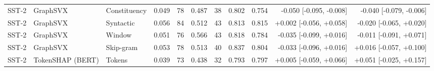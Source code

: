 \begin{table}[H]
\begin{tabular}{lllrrrrrrrr}
SST-2 & GraphSVX & Constituency & 0.049 & 78 & 0.487 & 38 & 0.802 & 0.754 & -0.050 [-0.095, -0.008] & -0.040 [-0.079, -0.006] \\
SST-2 & GraphSVX & Syntactic & 0.056 & 84 & 0.512 & 43 & 0.813 & 0.815 & +0.002 [-0.056, +0.058] & -0.020 [-0.065, +0.020] \\
SST-2 & GraphSVX & Window & 0.051 & 76 & 0.566 & 43 & 0.818 & 0.784 & -0.035 [-0.099, +0.016] & -0.011 [-0.091, +0.071] \\
SST-2 & GraphSVX & Skip-gram & 0.053 & 78 & 0.513 & 40 & 0.837 & 0.804 & -0.033 [-0.096, +0.016] & +0.016 [-0.057, +0.100] \\
SST-2 & TokenSHAP (BERT) & Tokens & 0.039 & 73 & 0.438 & 32 & 0.793 & 0.797 & +0.005 [-0.059, +0.066] & +0.051 [-0.025, +0.157] \\
\bottomrule
\end{tabular}
\end{table}

